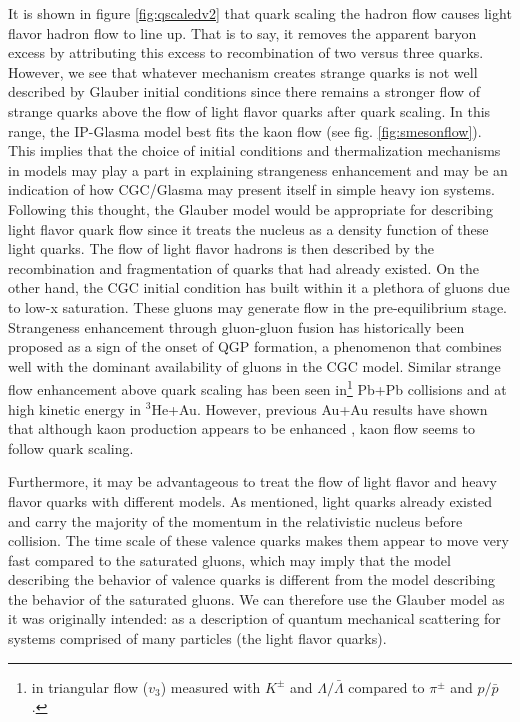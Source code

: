 It is shown in figure \ref{fig:qscaledv2} that quark scaling the hadron flow causes light flavor hadron flow to line up. That is to say, it removes the apparent baryon excess by attributing this excess to recombination of two versus three quarks. However, we see that whatever mechanism creates strange quarks is not well described by Glauber initial conditions since there remains a stronger flow of strange quarks above the flow of light flavor quarks after quark scaling. In this range, the IP-Glasma model best fits the kaon flow (see fig. \ref{fig:smesonflow}). This implies that the choice of initial conditions and thermalization mechanisms in models may play a part in explaining strangeness enhancement and may be an indication of how CGC/Glasma may present itself in simple heavy ion systems. Following this thought, the Glauber model would be appropriate for describing light flavor quark flow since it treats the nucleus as a density function of these light quarks. The flow of light flavor hadrons is then described by the recombination and fragmentation of quarks that had already existed. On the other hand, the CGC initial condition has built within it a plethora of gluons due to low-x saturation. These gluons may generate flow in the pre-equilibrium stage\citep{Krasnitz200321}. Strangeness enhancement through gluon-gluon fusion has historically been proposed as a sign of the onset of QGP formation\citep{PhysRevLett.48.1066}, a phenomenon that combines well with the dominant availability of gluons in the CGC model. Similar strange flow enhancement above quark scaling has been seen in\footnote{in triangular flow ($v_3$) measured with $K^{\pm}$ and $\Lambda/\bar{\Lambda}$ compared to $\pi^{\pm}$ and $p/\bar{p}$.} Pb+Pb collisions\citep{1742-6596-668-1-012099} and at high kinetic energy in $^3$He+Au\citep{huangQM2015}. However, previous Au+Au results have shown that although kaon production appears to be enhanced \citep{Hohne:1999jf}, kaon flow seems to follow quark scaling. \citep{PhysRevC.92.034913} 

Furthermore, it may be advantageous to treat the flow of light flavor and heavy flavor quarks with different models. As mentioned, light quarks already existed and carry the majority of the momentum in the relativistic nucleus before collision. The time scale of these valence quarks makes them appear to move very fast compared to the saturated gluons, which may imply that the model describing the behavior of valence quarks is different from the model describing the behavior of the saturated gluons. We can therefore use the Glauber model as it was originally intended: as a description of quantum mechanical scattering for systems comprised of many particles (the light flavor quarks). 

